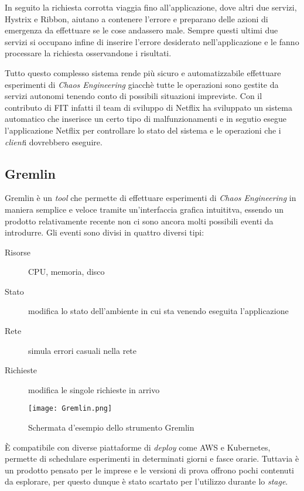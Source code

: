 In seguito la richiesta corrotta viaggia fino all'applicazione, dove altri due servizi, Hystrix e Ribbon, aiutano a contenere l'errore e preparano delle azioni di emergenza da effettuare se le cose andassero male.
Sempre questi ultimi due servizi si occupano infine di inserire l'errore desiderato nell'applicazione e le fanno processare la richiesta osservandone i risultati.

Tutto questo complesso sistema rende più sicuro e automatizzabile effettuare esperimenti di \textit{Chaos Engineering} giacchè tutte le operazioni sono gestite da servizi autonomi tenendo conto di possibili situazioni impreviste.
Con il contributo di FIT infatti il team di sviluppo di Netflix ha sviluppato un sistema automatico che inserisce un certo tipo di malfunzionamenti e in segutio esegue l'applicazione Netflix per controllare lo stato del sistema e le operazioni che i \textit{client}i dovrebbero eseguire.

\subsection{Gremlin}
Gremlin è un \textit{tool} che permette di effettuare esperimenti di \textit{Chaos Engineering} in maniera semplice e veloce tramite un'interfaccia grafica intuititva, essendo un prodotto relativamente recente non ci sono ancora molti possibili eventi da introdurre.
Gli eventi sono divisi in quattro diversi tipi:
\begin{description}
    \item[Risorse] CPU, memoria, disco
    \item[Stato] modifica lo stato dell'ambiente in cui sta venendo eseguita l'applicazione
    \item[Rete] simula errori casuali nella rete
    \item[Richieste] modifica le singole richieste in arrivo    
\end{description}
\begin{figure}[H]
    \centering
    \texttt{[image: Gremlin.png]}
    \label{tab:gremlin}
    \caption{Schermata d'esempio dello strumento Gremlin}
\end{figure}
È compatibile con diverse piattaforme di \textit{deploy} come AWS e Kubernetes, permette di schedulare esperimenti in determinati giorni e fasce orarie.
Tuttavia è un prodotto pensato per le imprese e le versioni di prova offrono pochi contenuti da esplorare, per questo dunque è stato scartato per l'utilizzo durante lo \textit{stage}.

